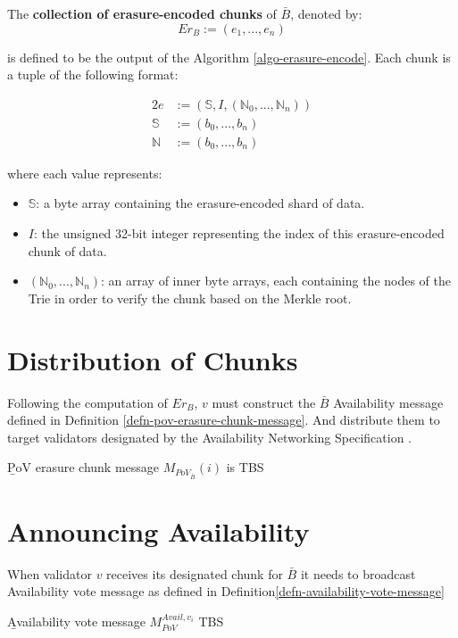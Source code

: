 \begin{definition}
  \label{defn-erasure-coded-chunks}
  The {\bf collection of erasure-encoded chunks} of $\bar{B}$, denoted by:
  \[
   Er_B := (e_1,...,e_n)
  \]

  is defined to be the output of the Algorithm \ref{algo-erasure-encode}.
  Each chunk is a tuple of the following format:

  \begin{alignat*}{2}
    e &:= (\mathbb{S}, I, (\mathbb{N}_0,...,\mathbb{N}_n)) \\
    \mathbb{S} &:= (b_0,...,b_n) \\
    \mathbb{N} &:= (b_0,...,b_n)
  \end{alignat*}

  where each value represents:
  \begin{itemize}
    \item $\mathbb{S}$: a byte array containing the erasure-encoded shard of
    data.
    \item $I$: the unsigned 32-bit integer representing the index of this
    erasure-encoded chunk of data.
    \item $(\mathbb{N}_0,...,\mathbb{N}_n)$: an array of inner byte arrays, each
    containing the nodes of the Trie in order to verify the chunk based on the
    Merkle root.
  \end{itemize}
\end{definition}

\section{Distribution of Chunks}\label{sect-distribute-chunks} Following the
computation of $Er_B$, $v$ must construct the $\bar{B}$ Availability message
defined in Definition \ref{defn-pov-erasure-chunk-message}. And distribute them
to target validators designated by the Availability Networking Specification
\cite{??}.

\begin{definition}
  \label{defn-pov-erasure-chunk-message}
        {\b PoV erasure chunk message} $M_{PoV_{\bar{B}}}(i)$ is TBS
\end{definition}

\section{Announcing Availability}\label{sect-voting-on-availability}

When validator $v$ receives its designated chunk for $\bar{B}$ it needs to
broadcast Availability vote message as defined in
Definition\ref{defn-availability-vote-message}
\begin{definition}
  \label{defn-availability-vote-message}
        {\b Availability vote message} $M_{PoV}^{Avail,v_i}$ TBS
\end{definition}

